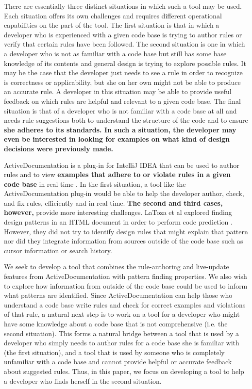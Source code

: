 \documentclass[12pt]{article}
\begin{document}
There are essentially three distinct situations in which such a tool may be used. Each situation offers its own challenges and requires different operational capabilities on the part of the tool. The first situation is that in which a developer who is experienced with a given code base is trying to author rules or verify that certain rules have been followed. The second situation is one in which a developer who is not as familiar with a code base but still has some base knowledge of its contents and general design is trying to explore possible rules. It may be the case that the developer just needs to see a rule in order to recognize is correctness or applicability, but she on her own might not be able to produce an accurate rule. A developer in this situation may be able to provide useful feedback on which rules are helpful and relevant to a given code base. The final situation is that of a developer who is not familiar with a code base at all and needs rule suggestions both to understand the structure of the code and to ensure \textbf{she adheres to its standards. In such a situation, the developer may even be interested in looking for examples on what kind of design decisions were previously made.}

ActiveDocumentation is a plug-in for IntelliJ IDEA that can be used to author rules and to view \textbf{examples that adhere to or violate rules in a given code base} in real time \cite{MehrpurEtAl2019}. In the first situation, a tool like the ActiveDocumentation plug-in would be able to help the developer author, check, and fix rules, efficiently and in real time. \textbf{The second and third cases, however,} provide more interesting challenges. LaToza et al explored finding design patterns in an HTML document in order to perform code prediction \cite{LaTozaEtAl2019}. However, they did not try to identify design rules that might explain that pattern nor did they integrate information from sources outside of the code base such as cursor information or search history.

We seek to develop a tool that combines the rule-authoring and live-update features from ActiveDocumentation with pattern finding properties. We also wish to explore how information from outside of the code base could be used to inform what patterns are identified. Since ActiveDocumentation can help those who understand a code base write rules and check for correct examples and violations of that rule, a natural next step is to work on a tool for a developer who might have some knowledge about a code base that is not comprehensive (i.e. the second situation). This forms a natural bridge between a tool that is used by a developer who simply needs to author rules for a code base she is familiar with (the first situation), and a tool that is used by someone who is completely unfamiliar with a code base and cannot provide helpful or accurate feedback about suggested rules. Thus, in this paper, we focus on developing a tool to help a developer who finds herself in the second situation.
\clearpage
\end{document}
